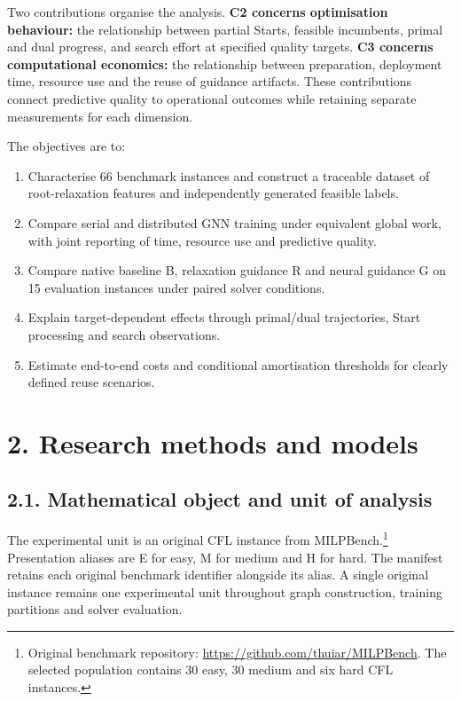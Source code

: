 \documentclass[
  british,
  10pt,
]{article}
\providecommand{\tightlist}{%
  \setlength{\itemsep}{0pt}\setlength{\parskip}{0pt}}
\begin{document}
Two contributions organise the analysis. \textbf{C2 concerns
optimisation behaviour:} the relationship between partial Starts,
feasible incumbents, primal and dual progress, and search effort at
specified quality targets. \textbf{C3 concerns computational economics:}
the relationship between preparation, deployment time, resource use and
the reuse of guidance artifacts. These contributions connect predictive
quality to operational outcomes while retaining separate measurements
for each dimension.

The objectives are to:

\begin{enumerate}
\def\labelenumi{\arabic{enumi}.}
\tightlist
\item
  Characterise 66 benchmark instances and construct a traceable dataset
  of root-relaxation features and independently generated feasible
  labels.
\item
  Compare serial and distributed GNN training under equivalent global
  work, with joint reporting of time, resource use and predictive
  quality.
\item
  Compare native baseline B, relaxation guidance R and neural guidance G
  on 15 evaluation instances under paired solver conditions.
\item
  Explain target-dependent effects through primal/dual trajectories,
  Start processing and search observations.
\item
  Estimate end-to-end costs and conditional amortisation thresholds for
  clearly defined reuse scenarios.
\end{enumerate}

\section{2. Research methods and
models}\label{research-methods-and-models}

\subsection{2.1. Mathematical object and unit of
analysis}\label{mathematical-object-and-unit-of-analysis}

The experimental unit is an original CFL instance from
MILPBench.\footnote{Original benchmark repository:
  \url{https://github.com/thuiar/MILPBench}. The selected population
  contains 30 easy, 30 medium and six hard CFL instances.} Presentation
aliases are E for easy, M for medium and H for hard. The manifest
retains each original benchmark identifier alongside its alias. A single
original instance remains one experimental unit throughout graph
construction, training partitions and solver evaluation.
\end{document}
